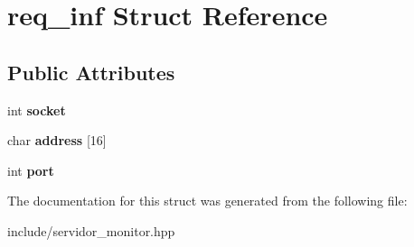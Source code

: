 \hypertarget{structreq__inf}{}\section{req\+\_\+inf Struct Reference}
\label{structreq__inf}
\subsection*{Public Attributes}
\begin{DoxyCompactItemize}
\item 
\mbox{\label{structreq__inf_adfe0732163f6fbcd3f4e96b8cb25f8fb}} 
int {\bfseries socket}
\item 
\mbox{\label{structreq__inf_ac00c238bc6390d8fd996d9861a2d2e0c}} 
char {\bfseries address} \mbox{[}16\mbox{]}
\item 
\mbox{\label{structreq__inf_af7e2b178d185850b6e390b77724777bd}} 
int {\bfseries port}
\end{DoxyCompactItemize}


The documentation for this struct was generated from the following file\+:\begin{DoxyCompactItemize}
\item 
include/servidor\+\_\+monitor.\+hpp\end{DoxyCompactItemize}
